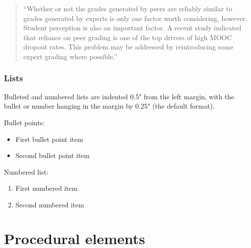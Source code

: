 \documentclass[
	letterpaper, %
]{jdf}
\begin{document}
\begin{quotation}
	\noindent “Whether or not the grades generated by peers are reliably similar to grades generated by experts is only one factor worth considering, however. Student perception is also an important factor. A recent study indicated that reliance on peer grading is one of the top drivers of high MOOC dropout rates. This problem may be addressed by reintroducing some expert grading where possible.” %
\end{quotation}

\subsubsection{Lists}
Bulleted and numbered lists are indented 0.5" from the left margin, with the bullet or number hanging in the margin by 0.25" (the default format).

Bullet points:

\begin{itemize}
	\item First bullet point item
	\item Second bullet point item
\end{itemize}

Numbered list:

\begin{enumerate}
	\item First numbered item
	\item Second numbered item
\end{enumerate}

\section{Procedural elements}
\end{document}
